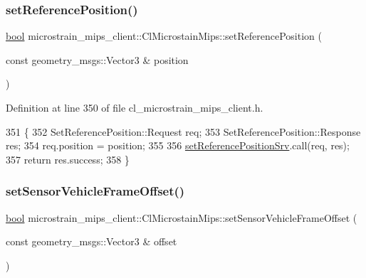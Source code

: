 \subsubsection{\texorpdfstring{set\+Reference\+Position()}{setReferencePosition()}}
{\footnotesize\ttfamily \hyperlink{classbool}{bool} microstrain\+\_\+mips\+\_\+client\+::\+Cl\+Microstain\+Mips\+::set\+Reference\+Position (\begin{DoxyParamCaption}\item[{const geometry\+\_\+msgs\+::\+Vector3 \&}]{position }\end{DoxyParamCaption})\hspace{0.3cm}{\ttfamily [inline]}}



Definition at line 350 of file cl\+\_\+microstrain\+\_\+mips\+\_\+client.\+h.


\begin{DoxyCode}
351     \{
352         SetReferencePosition::Request req;
353         SetReferencePosition::Response res;
354         req.position = position;
355 
356         \hyperlink{classmicrostrain__mips__client_1_1ClMicrostainMips_a9f088d1a085409bf8a952fac38e8f3d3}{setReferencePositionSrv}.call(req, res);
357         \textcolor{keywordflow}{return} res.success;
358     \}
\end{DoxyCode}
\mbox{\label{classmicrostrain__mips__client_1_1ClMicrostainMips_a8eb34d4f970c6e8a2a6ec3e80dd793bf}} 
\subsubsection{\texorpdfstring{set\+Sensor\+Vehicle\+Frame\+Offset()}{setSensorVehicleFrameOffset()}}
{\footnotesize\ttfamily \hyperlink{classbool}{bool} microstrain\+\_\+mips\+\_\+client\+::\+Cl\+Microstain\+Mips\+::set\+Sensor\+Vehicle\+Frame\+Offset (\begin{DoxyParamCaption}\item[{const geometry\+\_\+msgs\+::\+Vector3 \&}]{offset }\end{DoxyParamCaption})\hspace{0.3cm}{\ttfamily [inline]}}



